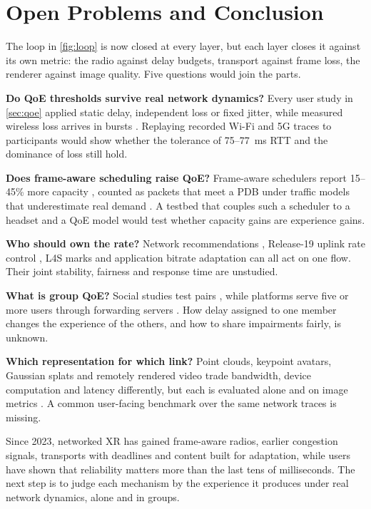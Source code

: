 \section{Open Problems and Conclusion}\label{sec:outlook}

The loop in \cref{fig:loop} is now closed at every layer, but each layer closes it against its own
metric: the radio against delay budgets, transport against frame loss, the renderer against image
quality. Five questions would join the parts.

\begin{openproblems}
\item \textbf{Do QoE thresholds survive real network dynamics?} Every user study in \cref{sec:qoe} applied
  static delay, independent loss or fixed jitter, while measured wireless loss arrives in bursts
  \cite{W7202080971}. Replaying recorded Wi-Fi and 5G traces to participants would show whether the
  tolerance of 75--77~ms RTT and the dominance of loss still hold.
\item \textbf{Does frame-aware scheduling raise QoE?} Frame-aware schedulers report 15--45\% more capacity
  \cite{W4402156740,W4406264804}, counted as packets that meet a PDB under traffic models that
  underestimate real demand \cite{W4399340506}. A testbed that couples such a scheduler to a headset and a
  QoE model would test whether capacity gains are experience gains.
\item \textbf{Who should own the rate?} Network recommendations \cite{W7161282618}, Release-19 uplink rate
  control \cite{W7164211432}, L4S marks \cite{W4408870658} and application bitrate adaptation
  \cite{W4405014964} can all act on one flow. Their joint stability, fairness and response time are
  unstudied.
\item \textbf{What is group QoE?} Social studies test pairs \cite{W4392600587,W4415821547}, while
  platforms serve five or more users through forwarding servers \cite{W4403981191}. How delay assigned to
  one member changes the experience of the others, and how to share impairments fairly, is unknown.
\item \textbf{Which representation for which link?} Point clouds, keypoint avatars, Gaussian splats and
  remotely rendered video trade bandwidth, device computation and latency differently, but each is
  evaluated alone and on image metrics \cite{W4404525293,W4416477288,W7160906632}. A common user-facing
  benchmark over the same network traces is missing.
\end{openproblems}

Since 2023, networked XR has gained frame-aware radios, earlier congestion signals, transports with
deadlines and content built for adaptation, while users have shown that reliability matters more than the
last tens of milliseconds. The next step is to judge each mechanism by the experience it produces under
real network dynamics, alone and in groups.
